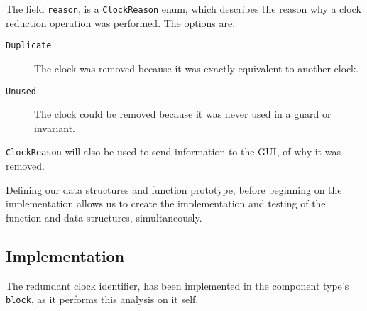 The field \texttt{reason}, is a \texttt{ClockReason} enum, which describes the reason why a clock reduction operation was performed. The options are:
\begin{description}
\item[\texttt{Duplicate}] The clock was removed because it was exactly equivalent to another clock.
\item[\texttt{Unused}] The clock could be removed because it was never used in a guard or invariant.
\end{description}

\texttt{ClockReason} will also be used to send information to the GUI, of why it was removed.

Defining our data structures and function prototype, before beginning on the implementation allows us to create the implementation and testing of the function and data structures, simultaneously. 

\subsection{Implementation}

The redundant clock identifier, has been implemented in the component type's \texttt{block}, as it performs this analysis on it self.

%
%
%
%
%
%
%
%
%
%
%
%
%
%
%
%


